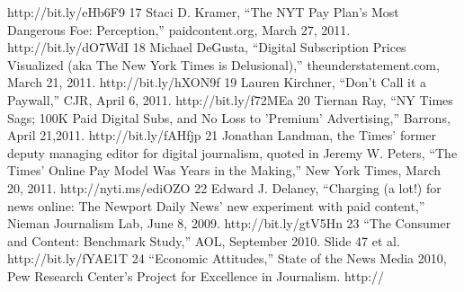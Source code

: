http://bit.ly/eHb6F9
17 Staci D. Kramer, ``The NYT Pay Plan's Most Dangerous Foe: Perception,'' paidcontent.org,
March 27, 2011. http://bit.ly/dO7WdI
18 Michael DeGusta, ``Digital Subscription Prices Visualized (aka The New York Times is
Delusional),'' theunderstatement.com, March 21, 2011. http://bit.ly/hXON9f
19 Lauren Kirchner, ``Don't Call it a Paywall,'' CJR, April 6, 2011. http://bit.ly/f72MEa
20 Tiernan Ray, ``NY Times Sags; 100K Paid Digital Subs, and No Loss to 'Premium'
Advertising,'' Barrons, April 21,2011. http://bit.ly/fAHfjp
21 Jonathan Landman, the Times' former deputy managing editor for digital journalism, quoted in
Jeremy W. Peters, ``The Times' Online Pay Model Was Years in the Making,'' New York Times,
March 20, 2011. http://nyti.ms/ediOZO
22 Edward J. Delaney, ``Charging (a lot!) for news online: The Newport Daily News' new
experiment with paid content,'' Nieman Journalism Lab, June 8, 2009. http://bit.ly/gtV5Hn
23 ``The Consumer and Content: Benchmark Study,'' AOL, September 2010. Slide 47 et al.
http://bit.ly/fYAE1T
24 ``Economic Attitudes,'' State of the News Media 2010, Pew Research Center's Project for
Excellence in Journalism. http://


